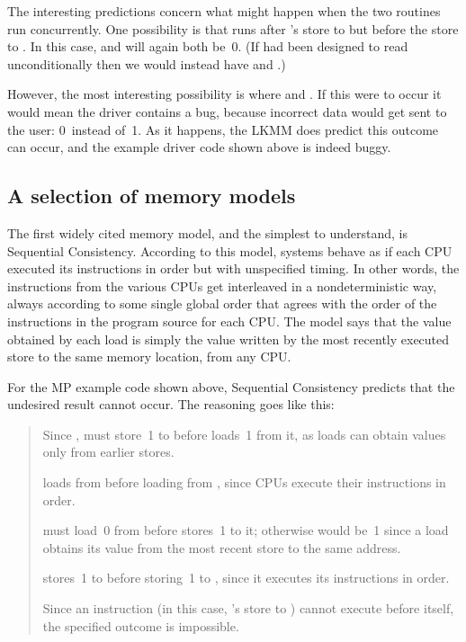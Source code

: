 The interesting predictions concern what might happen when the two
routines run concurrently.
One possibility is that  runs after 's store to 
but before the store to .
In this case,  and  will again both be~0.
(If  had been designed to read  unconditionally then we
would instead have  and .)

However, the most interesting possibility is where  and
.
If this were to occur it would mean the driver contains a bug, because
incorrect data would get sent to the user:
0~instead of~1.
As it happens, the LKMM does predict this outcome can occur, and the example
driver code shown above is indeed buggy.


\subsection{A selection of memory models}

The first widely cited memory model, and the simplest to understand,
is Sequential Consistency.
According to this model, systems behave as if each CPU executed its
instructions in order but with unspecified timing.
In other words, the instructions from the various CPUs get interleaved
in a nondeterministic way, always according to some single global order
that agrees with the order of the instructions in the program source for
each CPU\@.
The model says that the value obtained by each load is simply the value
written by the most recently executed store to the same memory location,
from any CPU\@.

For the MP example code shown above, Sequential Consistency predicts
that the undesired result  cannot occur.
The reasoning goes like this:

\begin{quote}
  Since ,  must store~1 to  before 
  loads~1 from it, as loads can obtain values only from earlier stores.

   loads from  before loading from , since CPUs
  execute their instructions in order.

   must load~0 from  before  stores~1 to it;
  otherwise  would be~1 since a load obtains its value from the
  most recent store to the same address.

   stores~1 to  before storing~1 to , since it
  executes its instructions in order.

  Since an instruction (in this case, 's store to )
  cannot execute before itself, the specified outcome is impossible.
\end{quote}

